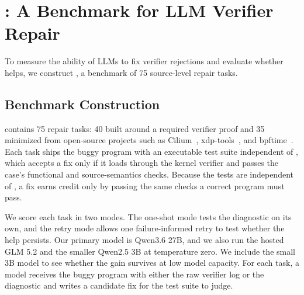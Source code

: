 

\section{\bench: A Benchmark for LLM Verifier Repair}
\label{sec:benchmark}

To measure the ability of LLMs to fix verifier rejections and evaluate whether \sys helps, we construct \bench, a benchmark of 75 source-level repair tasks.

\subsection{Benchmark Construction}
\label{sec:benchmark-construction}

\bench contains 75 repair tasks: 40 built around a required verifier proof and 35 minimized from open-source projects such as Cilium~\cite{cilium}, xdp-tools~\cite{xdptools}, and bpftime~\cite{zheng2025extending}.
Each task ships the buggy program with an executable test suite independent of \sys, which accepts a fix only if it loads through the kernel verifier and passes the case's functional and source-semantics checks.
Because the tests are independent of \sys, a fix earns credit only by passing the same checks a correct program must pass.


We score each task in two modes.
The one-shot mode tests the diagnostic on its own, and the retry mode allows one failure-informed retry to test whether the help persists.
Our primary model is Qwen3.6 27B, and we also run the hosted GLM 5.2 and the smaller Qwen2.5 3B at temperature zero.
We include the small 3B model to see whether the gain survives at low model capacity.
For each task, a model receives the buggy program with either the raw verifier log or the \sys diagnostic and writes a candidate fix for the test suite to judge.

